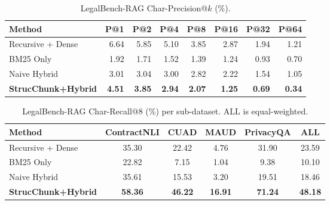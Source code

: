 \documentclass[sn-mathphys,Numbered]{sn-jnl}%
\begin{document}
\begin{table}[htbp]
\centering
\begin{adjustbox}{max width=\textwidth}
\begin{tabular}{lrrrrrrr}
\toprule
\textbf{Method} & \textbf{P@1} & \textbf{P@2} & \textbf{P@4}
               & \textbf{P@8} & \textbf{P@16} & \textbf{P@32}
               & \textbf{P@64} \\
\midrule
Recursive + Dense      & 6.64 & 5.85 & 5.10 & 3.85 & 2.87 & 1.94 & 1.21 \\
BM25 Only              & 1.92 & 1.71 & 1.52 & 1.39 & 1.24 & 0.93 & 0.70 \\
Naive Hybrid           & 3.01 & 3.04 & 3.00 & 2.82 & 2.22 & 1.54 & 1.05 \\
\textbf{StrucChunk+Hybrid} & \textbf{4.51} & \textbf{3.85}
                       & \textbf{2.94} & \textbf{2.07}
                       & \textbf{1.25} & \textbf{0.69} & \textbf{0.34} \\
\bottomrule
\end{tabular}
\end{adjustbox}
\caption{LegalBench-RAG Char-Precision@$k$ (\%).}
\label{tab:lbr_precision}
\end{table}

\begin{table}[htbp]
\centering
\begin{adjustbox}{max width=\textwidth}
\begin{tabular}{lccccc}
\toprule
\textbf{Method} & \textbf{ContractNLI} & \textbf{CUAD}
               & \textbf{MAUD} & \textbf{PrivacyQA} & \textbf{ALL} \\
\midrule
Recursive + Dense    & 35.30 & 22.42 &  4.76 & 31.90 & 23.59 \\
BM25 Only            & 22.82 &  7.15 &  1.04 &  9.38 & 10.10 \\
Naive Hybrid         & 35.61 & 15.53 &  3.20 & 19.51 & 18.46 \\
\textbf{StrucChunk+Hybrid} & \textbf{58.36} & \textbf{46.22}
                     & \textbf{16.91} & \textbf{71.24} & \textbf{48.18} \\
\bottomrule
\end{tabular}
\end{adjustbox}
\caption{LegalBench-RAG Char-Recall@8 (\%) per sub-dataset.  ALL is equal-weighted.}
\label{tab:lbr_subdatasets}
\end{table}
\end{document}
